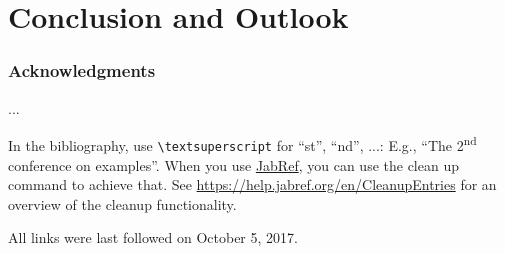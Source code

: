 \documentclass[runningheads,a4paper]{llncs}[2015/06/24]
\begin{document}
\section{Conclusion and Outlook}

\subsubsection*{Acknowledgments}
...

In the bibliography, use \texttt{\textbackslash textsuperscript} for ``st'', ``nd'', ...:
E.g., \enquote{The 2\textsuperscript{nd} conference on examples}.
When you use \href{https://www.jabref.org}{JabRef}, you can use the clean up command to achieve that.
See \url{https://help.jabref.org/en/CleanupEntries} for an overview of the cleanup functionality.




All links were last followed on October 5, 2017.
\end{document}
